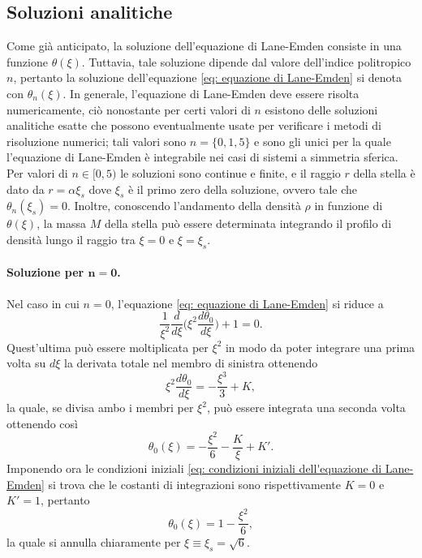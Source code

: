 \documentclass{article}
\numberwithin{equation}{section}
\begin{document}
\subsection{Soluzioni analitiche}
Come già anticipato, la soluzione dell'equazione di Lane-Emden consiste in una funzione $\theta(\xi)$. Tuttavia, tale soluzione dipende dal valore dell'indice politropico $n$, pertanto la soluzione dell'equazione \eqref{eq: equazione di Lane-Emden} si denota con $\theta_n(\xi)$. In generale, l'equazione di Lane-Emden deve essere risolta numericamente, ciò nonostante per certi valori di $n$ esistono delle soluzioni analitiche esatte che possono eventualmente usate per verificare i metodi di risoluzione numerici; tali valori sono $n = \{0,1,5\}$ e sono gli unici per la quale l'equazione di Lane-Emden è integrabile nei casi di sistemi a simmetria sferica. Per valori di $n \in [0,5)$ le soluzioni sono continue e finite, e il raggio $r$ della stella è dato da $r = \alpha\xi_s$ dove $\xi_s$ è il primo zero della soluzione, ovvero tale che $\theta_n(\xi_s) = 0$. Inoltre, conoscendo l'andamento della densità $\rho$ in funzione di $\theta(\xi)$, la massa $M$ della stella può essere determinata integrando il profilo di densità lungo il raggio tra $\xi = 0$ e $\xi = \xi_s$.

\paragraph{Soluzione per $\bm{n = 0}$.} Nel caso in cui $n = 0$, l'equazione \eqref{eq: equazione di Lane-Emden} si riduce a 
\begin{equation}
    \frac{1}{\xi^2}\frac{d}{d\xi}\bigg(\xi^2\frac{d\theta_0}{d\xi}\bigg) + 1 = 0.
\end{equation}
Quest'ultima può essere moltiplicata per $\xi^2$ in modo da poter integrare una prima volta su $d\xi$ la derivata totale nel membro di sinistra ottenendo
\begin{equation}
    \xi^2\frac{d\theta_0}{d\xi} = -\frac{\xi^3}{3} + K,
\end{equation}
la quale, se divisa ambo i membri per $\xi^2$, può essere integrata una seconda volta ottenendo così 
\begin{equation}
    \theta_0(\xi) = -\frac{\xi^2}{6} - \frac{K}{\xi} + K'.
\end{equation}
Imponendo ora le condizioni iniziali \eqref{eq: condizioni iniziali dell'equazione di Lane-Emden} si trova che le costanti di integrazioni sono rispettivamente $K = 0$ e $K' = 1$, pertanto 
\begin{equation}
\label{eq: soluzione per n = 0}
    \theta_0(\xi) = 1 - \frac{\xi^2}{6},
\end{equation}
la quale si annulla chiaramente per $\xi \equiv \xi_s = \sqrt{6}$.
\end{document}
